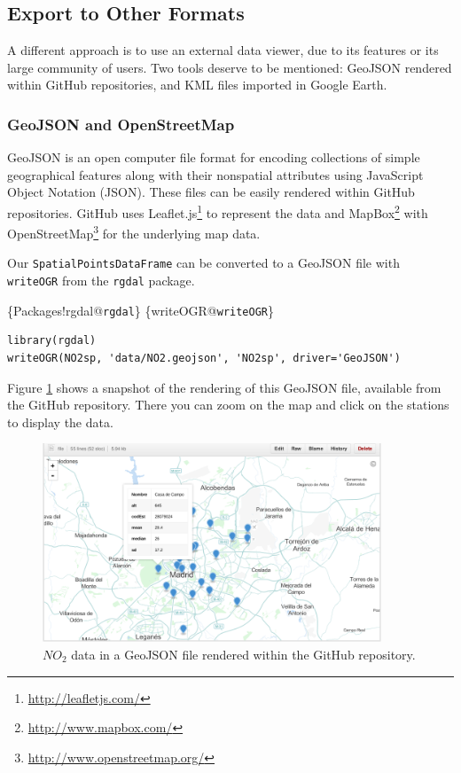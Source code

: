 \subsection{Export to Other Formats}
\label{sec:orgc97141f}

A different approach is to use an external data viewer, due to its
features or its large community of users. Two tools deserve to be
mentioned: GeoJSON rendered within GitHub repositories, and KML files
imported in Google Earth\texttrademark.

\subsubsection{GeoJSON and OpenStreetMap}
\label{sec:orgf5f3c1f}
GeoJSON is an open computer file format for encoding collections of
simple geographical features along with their nonspatial attributes
using JavaScript Object Notation (JSON). These files can be easily
rendered within GitHub repositories. GitHub uses Leaflet.js\footnote{\url{http://leafletjs.com/}} to
represent the data and MapBox\footnote{\url{http://www.mapbox.com/}} with OpenStreetMap\footnote{\url{http://www.openstreetmap.org/}} for the
underlying map data.

Our \texttt{SpatialPointsDataFrame} can be converted to a GeoJSON file with
\texttt{writeOGR} from the \texttt{rgdal} package. 

\begin{LaTeX}
\index\{Packages!rgdal@\texttt{rgdal}\}
\index\{writeOGR@\texttt{writeOGR}\}
\end{LaTeX}

\lstset{language=r,label= ,caption= ,captionpos=b,numbers=none}
\begin{lstlisting}
library(rgdal)
writeOGR(NO2sp, 'data/NO2.geojson', 'NO2sp', driver='GeoJSON')
\end{lstlisting}

Figure \ref{fig:geojson} shows a snapshot of the rendering of this
GeoJSON file, available from the GitHub repository. There you can zoom
on the map and click on the stations to display the data.

\begin{LaTeX}
\begin{figure}
\includegraphics[width=0.9\textwidth]{figs/geojson.png}
\caption{\label{fig:geojson}$NO_2$ data in a GeoJSON file rendered within the GitHub repository.}
\end{figure}
\end{LaTeX}

